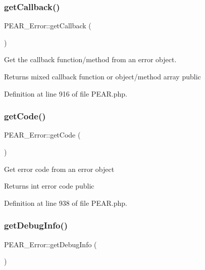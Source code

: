 \mbox{\label{classPEAR__Error_a8060f0ee49b7346e4ca6e04aa70ae25c}} 
\subsubsection{\texorpdfstring{get\+Callback()}{getCallback()}}
{\footnotesize\ttfamily P\+E\+A\+R\+\_\+\+Error\+::get\+Callback (\begin{DoxyParamCaption}{ }\end{DoxyParamCaption})}

Get the callback function/method from an error object.

\begin{DoxyReturn}{Returns}
mixed callback function or object/method array  public 
\end{DoxyReturn}


Definition at line 916 of file P\+E\+A\+R.\+php.

\mbox{\label{classPEAR__Error_a54924b41ab0d14ed7007f3c1b3f0ca82}} 
\subsubsection{\texorpdfstring{get\+Code()}{getCode()}}
{\footnotesize\ttfamily P\+E\+A\+R\+\_\+\+Error\+::get\+Code (\begin{DoxyParamCaption}{ }\end{DoxyParamCaption})}

Get error code from an error object

\begin{DoxyReturn}{Returns}
int error code  public 
\end{DoxyReturn}


Definition at line 938 of file P\+E\+A\+R.\+php.

\mbox{\label{classPEAR__Error_a33eade09a689fdb4e5a79727fa407f13}} 
\subsubsection{\texorpdfstring{get\+Debug\+Info()}{getDebugInfo()}}
{\footnotesize\ttfamily P\+E\+A\+R\+\_\+\+Error\+::get\+Debug\+Info (\begin{DoxyParamCaption}{ }\end{DoxyParamCaption})}


